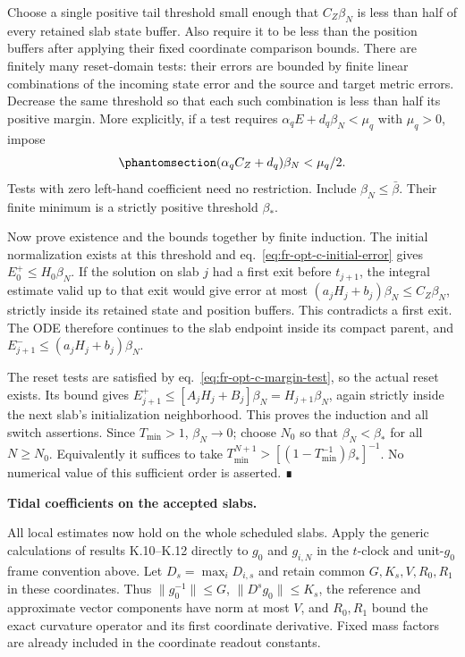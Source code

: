 \documentclass[
  english,
  11pt,
  reqno]{amsart}
\begin{document}
Choose a single positive tail threshold small enough that \(C_Z\beta_N\)
is less than half of every retained slab state buffer. Also require it
to be less than the position buffers after applying their fixed
coordinate comparison bounds. There are finitely many reset-domain
tests: their errors are bounded by finite linear combinations of the
incoming state error and the source and target metric errors. Decrease
the same threshold so that each such combination is less than half its
positive margin. More explicitly, if a test requires
\(\alpha_qE+ d_q\beta_N<\mu_q\) with \(\mu_q>0\), impose
\begin{equation}\protect\phantomsection\label{eq:fr-opt-c-margin-test}{
 (\alpha_q C_Z+d_q)\beta_N<\mu_q/2.
}\end{equation} Tests with zero left-hand coefficient need no
restriction. Include \(\beta_N\le\bar\beta\). Their finite minimum is a
strictly positive threshold \(\beta_*\).

Now prove existence and the bounds together by finite induction. The
initial normalization exists at this threshold and
eq.~\ref{eq:fr-opt-c-initial-error} gives \(E_0^+\le H_0\beta_N\). If
the solution on slab \(j\) had a first exit before \(t_{j+1}\), the
integral estimate valid up to that exit would give error at most
\((a_jH_j+b_j)\beta_N\le C_Z\beta_N\), strictly inside its retained
state and position buffers. This contradicts a first exit. The ODE
therefore continues to the slab endpoint inside its compact parent, and
\(E_{j+1}^-\le(a_jH_j+b_j)\beta_N\).

The reset tests are satisfied by eq.~\ref{eq:fr-opt-c-margin-test}, so
the actual reset exists. Its bound gives
\(E_{j+1}^+\le[A_jH_j+B_j]\beta_N=H_{j+1}\beta_N\), again strictly
inside the next slab's initialization neighborhood. This proves the
induction and all switch assertions. Since \(T_{\min}>1\),
\(\beta_N\to0\); choose \(N_0\) so that \(\beta_N<\beta_*\) for all
\(N\ge N_0\). Equivalently it suffices to take
\(T_{\min}^{N+1}>[(1-T_{\min}^{-1})\beta_*]^{-1}\). No numerical value
of this sufficient order is asserted. ∎

\protect{}\label{sec:fr-opt-c-tidal}

\textbf{Tidal coefficients on the accepted slabs.}

All local estimates now hold on the whole scheduled slabs. Apply the
generic calculations of results K.10--K.12 directly to \(g_0\) and
\(g_{i,N}\) in the \(t\)-clock and unit-\(g_0\) frame convention above.
Let \(D_s=\max_iD_{i,s}\) and retain common \(G,K_s,V,R_0,R_1\) in these
coordinates. Thus \(\|g_0^{-1}\|\le G\), \(\|D^sg_0\|\le K_s\), the
reference and approximate vector components have norm at most \(V\), and
\(R_0,R_1\) bound the exact curvature operator and its first coordinate
derivative. Fixed mass factors are already included in the coordinate
readout constants.
\end{document}
